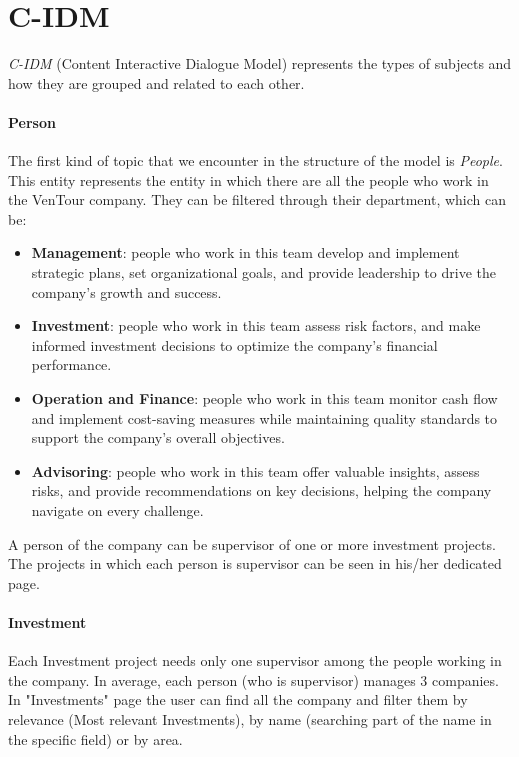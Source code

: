 \documentclass[../../DD.tex]{subfiles}
\begin{document}
\section{C-IDM}
\textit{C-IDM} (Content Interactive Dialogue Model) represents the types of subjects and how they are grouped and related to each other.

\paragraph{Person} The first kind of topic that we encounter in the structure of the model is \textit{People}. This entity represents the entity in which there are all the people who work in the VenTour company. 
    They can be filtered through their department, which can be:
    \begin{itemize}
        \item \textbf{Management}: people who work in this team develop and implement strategic plans, set organizational goals, and provide leadership to drive the company's growth and success. 
        \item \textbf{Investment}: people who work in this team assess risk factors, and make informed investment decisions to optimize the company's financial performance.
        \item \textbf{Operation and Finance}: people who work in this team monitor cash flow and implement cost-saving measures while maintaining quality standards to support the company's overall objectives.
        \item \textbf{Advisoring}: people who work in this team offer valuable insights, assess risks, and provide recommendations on key decisions, helping the company navigate on every challenge.
    \end{itemize}
    A person of the company can be supervisor of one or more investment projects. The projects in which each person is supervisor can be seen in his/her dedicated page.

    \paragraph{Investment} Each Investment project needs only one supervisor among the people working in the company. In average, each person (who is supervisor) manages 3 companies. \\
    In "Investments" page the user can find all the company and filter them by relevance (Most relevant Investments), by name (searching part of the name in the specific field) or by area.\\
\end{document}
